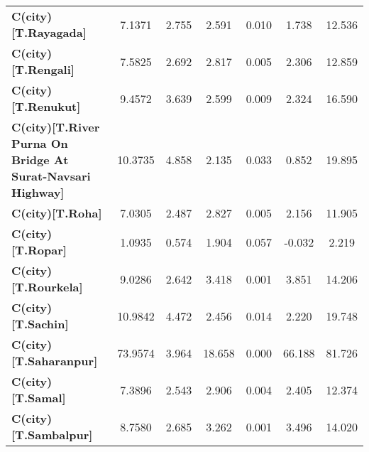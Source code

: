 \begin{center}
\begin{tabular}{lcccccc}
\textbf{C(city)[T.Rayagada]}                                                                        &       7.1371  &        2.755     &     2.591  &         0.010        &        1.738    &       12.536     \\
\textbf{C(city)[T.Rengali]}                                                                         &       7.5825  &        2.692     &     2.817  &         0.005        &        2.306    &       12.859     \\
\textbf{C(city)[T.Renukut]}                                                                         &       9.4572  &        3.639     &     2.599  &         0.009        &        2.324    &       16.590     \\
\textbf{C(city)[T.River Purna On Bridge At Surat-Navsari Highway]}                                  &      10.3735  &        4.858     &     2.135  &         0.033        &        0.852    &       19.895     \\
\textbf{C(city)[T.Roha]}                                                                            &       7.0305  &        2.487     &     2.827  &         0.005        &        2.156    &       11.905     \\
\textbf{C(city)[T.Ropar]}                                                                           &       1.0935  &        0.574     &     1.904  &         0.057        &       -0.032    &        2.219     \\
\textbf{C(city)[T.Rourkela]}                                                                        &       9.0286  &        2.642     &     3.418  &         0.001        &        3.851    &       14.206     \\
\textbf{C(city)[T.Sachin]}                                                                          &      10.9842  &        4.472     &     2.456  &         0.014        &        2.220    &       19.748     \\
\textbf{C(city)[T.Saharanpur]}                                                                      &      73.9574  &        3.964     &    18.658  &         0.000        &       66.188    &       81.726     \\
\textbf{C(city)[T.Samal]}                                                                           &       7.3896  &        2.543     &     2.906  &         0.004        &        2.405    &       12.374     \\
\textbf{C(city)[T.Sambalpur]}                                                                       &       8.7580  &        2.685     &     3.262  &         0.001        &        3.496    &       14.020     \\

\end{tabular}
\end{center}
